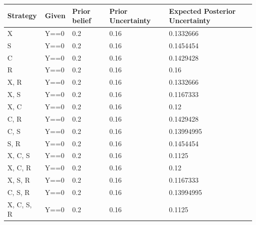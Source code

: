 \documentclass[
  12pt,
]{book}
\newenvironment{Shaded}{\begin{snugshade}}{\end{snugshade}}
\newcommand{\DataTypeTok}[1]{\textcolor[rgb]{0.13,0.29,0.53}{#1}}
\newcommand{\KeywordTok}[1]{\textcolor[rgb]{0.13,0.29,0.53}{\textbf{#1}}}
\newcommand{\NormalTok}[1]{#1}
\newcommand{\OperatorTok}[1]{\textcolor[rgb]{0.81,0.36,0.00}{\textbf{#1}}}
\newcommand{\OtherTok}[1]{\textcolor[rgb]{0.56,0.35,0.01}{#1}}
\newcommand{\StringTok}[1]{\textcolor[rgb]{0.31,0.60,0.02}{#1}}
\begin{document}
\begin{Shaded}
\end{Shaded}

\begin{tabular}{l|l|l|l|l}
\hline
Strategy & Given & Prior belief & Prior Uncertainty & Expected Posterior Uncertainty\\
\hline
X & Y==0 & 0.2 & 0.16 & 0.1332666\\
\hline
S & Y==0 & 0.2 & 0.16 & 0.1454454\\
\hline
C & Y==0 & 0.2 & 0.16 & 0.1429428\\
\hline
R & Y==0 & 0.2 & 0.16 & 0.16\\
\hline
X, R & Y==0 & 0.2 & 0.16 & 0.1332666\\
\hline
X, S & Y==0 & 0.2 & 0.16 & 0.1167333\\
\hline
X, C & Y==0 & 0.2 & 0.16 & 0.12\\
\hline
C, R & Y==0 & 0.2 & 0.16 & 0.1429428\\
\hline
C, S & Y==0 & 0.2 & 0.16 & 0.13994995\\
\hline
S, R & Y==0 & 0.2 & 0.16 & 0.1454454\\
\hline
X, C, S & Y==0 & 0.2 & 0.16 & 0.1125\\
\hline
X, C, R & Y==0 & 0.2 & 0.16 & 0.12\\
\hline
X, S, R & Y==0 & 0.2 & 0.16 & 0.1167333\\
\hline
C, S, R & Y==0 & 0.2 & 0.16 & 0.13994995\\
\hline
X, C, S, R & Y==0 & 0.2 & 0.16 & 0.1125\\
\hline
\end{tabular}
\end{document}
